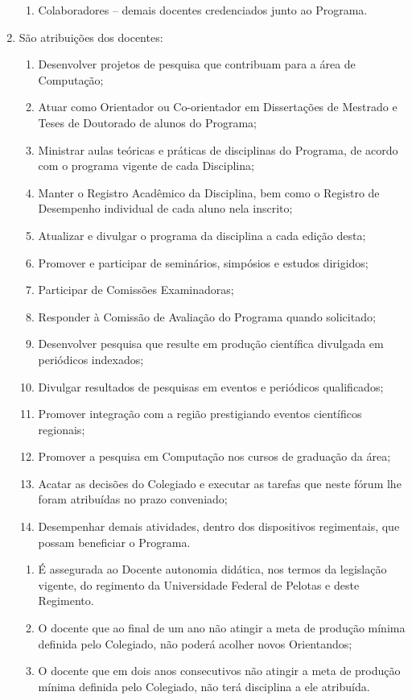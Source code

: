 \documentclass{article}
\begin{document}
\begin{enumerate}
\begin{enumerate}[label=\Roman*]
		\item Colaboradores – demais docentes credenciados junto ao Programa.

	\end{enumerate}

	\item São atribuições dos docentes:
	\begin{enumerate}[label=\Roman*]
		\item 	Desenvolver projetos de pesquisa que contribuam para a área de Computação;
		\item	Atuar como Orientador ou Co-orientador em Dissertações de Mestrado e Teses de Doutorado de alunos do Programa;
		\item	Ministrar aulas teóricas e práticas de disciplinas do Programa, de acordo com o programa vigente de cada Disciplina;
		\item	Manter o Registro Acadêmico da Disciplina, bem como o Registro de Desempenho individual de cada aluno nela inscrito;
		\item	Atualizar e divulgar o programa da disciplina a cada edição desta;
		\item	Promover e participar de seminários, simpósios e estudos dirigidos;
		\item	Participar de Comissões Examinadoras;
		\item	Responder à Comissão de Avaliação do Programa quando solicitado;
		\item	Desenvolver pesquisa que resulte em produção científica divulgada em periódicos indexados;
		\item	Divulgar resultados de pesquisas em eventos e periódicos qualificados;
		\item	Promover integração com a região prestigiando eventos científicos regionais;
		\item	Promover a pesquisa em Computação nos cursos de graduação da área;
		\item	Acatar as decisões do Colegiado e executar as tarefas que neste fórum lhe foram atribuídas no prazo conveniado;
		\item	Desempenhar demais atividades, dentro dos dispositivos regimentais, que possam beneficiar o Programa.
	\end{enumerate}

	\begin{enumerate}
		\item É assegurada ao Docente autonomia didática, nos termos da legislação vigente, do regimento da Universidade Federal de Pelotas e deste Regimento.

		\item O docente que ao final de um ano não atingir a meta de produção mínima definida pelo Colegiado, não poderá acolher novos Orientandos;

		\item O docente que em dois anos consecutivos não atingir a meta de produção mínima definida pelo Colegiado, não terá disciplina a ele atribuída.

	\end{enumerate}
\end{enumerate}
\end{document}
